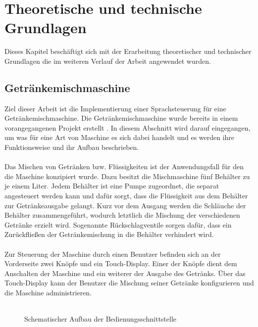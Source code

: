 \chapter{Theoretische und technische Grundlagen}
Dieses Kapitel beschäftigt sich mit der Erarbeitung theoretischer und technischer Grundlagen die im weiteren Verlauf der Arbeit angewendet wurden.
\section{Getränkemischmaschine}
Ziel dieser Arbeit ist die Implementierung einer Sprachsteuerung für eine Getränkemischmaschine. Die Getränkemischmaschine wurde bereits in einem vorangegangenen Projekt erstellt \cite{mischmaschine}. In diesem Abschnitt wird darauf eingegangen, um was für eine Art von Maschine es sich dabei handelt und es werden ihre Funktionsweise und ihr Aufbau beschrieben.\\\\
Das Mischen von Getränken bzw. Flüssigkeiten ist der Anwendungsfall für den die Maschine konzipiert wurde. Dazu besitzt die Mischmaschine fünf Behälter zu je einem Liter. Jedem Behälter ist eine Pumpe zugeordnet, die separat angesteuert werden kann und dafür sorgt, dass die Flüssigkeit aus dem Behälter zur Getränkeausgabe gelangt. Kurz vor dem Ausgang werden die Schläuche der Behälter zusammengeführt, wodurch letztlich die Mischung der verschiedenen Getränke erzielt wird. Sogenannte \glqq{}Rückschlagventile\grqq{} sorgen dafür, dass ein Zurückfließen der Getränkemischung in die Behälter verhindert wird.\\\\
Zur Steuerung der Maschine durch einen Benutzer befinden sich an der Vorderseite zwei Knöpfe und ein Touch-Display. Einer der Knöpfe dient dem Anschalten der Maschine und ein weiterer der Ausgabe des Getränks. Über das Touch-Display kann der Benutzer die Mischung seiner Getränke konfigurieren und die Maschine administrieren.\\\\
\begin{figure}[H]
    \centering
    \caption{Schematischer Aufbau der Bedienungsschnittstelle}
    \label{fig:bedienungsschnittstelle_mischmaschine}
\end{figure}
